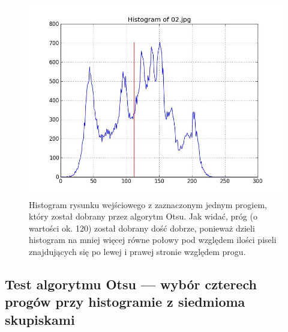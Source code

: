 \documentclass[10pt]{llncs}
\begin{document}
\begin{figure}[h!]
  \centering
  \includegraphics[scale=.3, clip]{img/03_histogram.jpg}
	\caption[]
  {Histogram rysunku wejściowego z zaznaczonym jednym progiem, który został dobrany przez algorytm Otsu. Jak widać, próg (o wartości ok. 120) został dobrany dość dobrze, ponieważ dzieli histogram na mniej więcej równe połowy pod względem ilości piseli znajdujących się po lewej i prawej stronie względem progu.}
\end{figure}

\clearpage
\subsection{Test algorytmu Otsu --- wybór czterech progów przy histogramie z siedmioma skupiskami}
\end{document}
